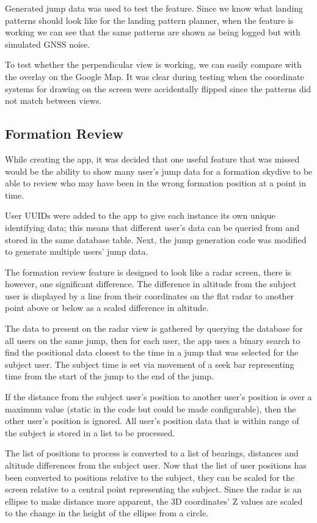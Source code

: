Generated jump data was used to test the feature. Since we know what landing patterns should look like for the landing pattern planner, when the feature is working we can see that the same patterns are shown as being logged but with simulated GNSS noise.

To test whether the perpendicular view is working, we can easily compare with the overlay on the Google Map. It was clear during testing when the coordinate systems for drawing on the screen were accidentally flipped since the patterns did not match between views.

\subsection{Formation Review}\label{subsec:formation-review}
While creating the app, it was decided that one useful feature that was missed would be the ability to show many user's jump data for a formation skydive to be able to review who may have been in the wrong formation position at a point in time.

User UUIDs were added to the app to give each instance its own unique identifying data; this means that different user's data can be queried from and stored in the same database table. Next, the jump generation code was modified to generate multiple users' jump data.

The formation review feature is designed to look like a radar screen, there is however, one significant difference. The difference in altitude from the subject user is displayed by a line from their coordinates on the flat radar to another point above or below as a scaled difference in altitude.

The data to present on the radar view is gathered by querying the database for all users on the same jump, then for each user, the app uses a binary search to find the positional data closest to the time in a jump that was selected for the subject user. The subject time is set via movement of a seek bar representing time from the start of the jump to the end of the jump.

If the distance from the subject user's position to another user's position is over a maximum value (static in the code but could be made configurable), then the other user's position is ignored. All user's position data that is within range of the subject is stored in a list to be processed.

The list of positions to process is converted to a list of bearings, distances and altitude differences from the subject user. Now that the list of user positions has been converted to positions relative to the subject, they can be scaled for the screen relative to a central point representing the subject. Since the radar is an ellipse to make distance more apparent, the 3D coordinates' Z values are scaled to the change in the height of the ellipse from a circle.

